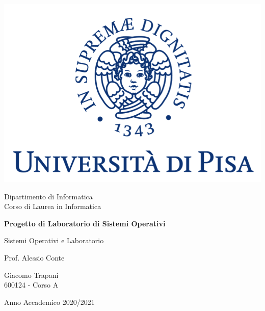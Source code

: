 \documentclass[11pt, italian, openany]{book}
\begin{document}
\begin{sloppypar}
\begin{titlepage}
	\clearpage\thispagestyle{empty}
	\centering
	\vspace{1cm}

    \includegraphics[scale=0.60]{unipi-logo.png}
    
	{\normalsize \noindent Dipartimento di Informatica \\
	             Corso di Laurea in Informatica \par}
	
	\vspace{2cm}
	{\Huge \textbf{Progetto di Laboratorio di Sistemi Operativi} \par}
	\vspace{1cm}
	{\large Sistemi Operativi e Laboratorio}
	\vspace{5cm}

    \begin{minipage}[t]{0.47\textwidth}
    	{\large{ Prof. Alessio Conte}}
    \end{minipage}\hfill\begin{minipage}[t]{0.47\textwidth}\raggedleft
    	{\large {Giacomo Trapani \\ 600124 - Corso A\\ }}
    \end{minipage}

    \vspace{4cm}

	{\normalsize Anno Accademico 2020/2021 \par}

	\pagebreak

\end{titlepage}

\end{sloppypar}
\end{document}
